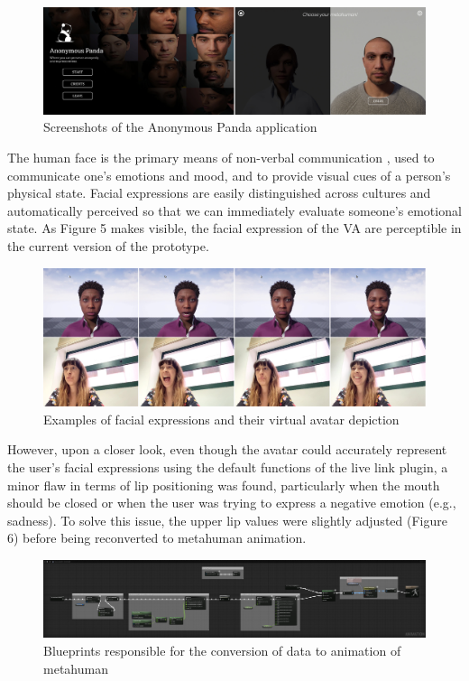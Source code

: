 \begin{figure}[h!]
\includegraphics[width=\textwidth]{figures/ui-app.jpg}
\centering
\caption{Screenshots of the Anonymous Panda application}
\end{figure}

The human face is the primary means of non-verbal communication \cite{MALO20, KUJ03, SAU19}, used to communicate one's emotions and mood, and to provide visual cues of a person's physical state. Facial expressions are easily distinguished across cultures and automatically perceived so that we can immediately evaluate someone's emotional state. As Figure 5 makes visible, the facial expression of the VA are perceptible in the current version of the prototype. 

\begin{figure}[h!]
\includegraphics[width=\textwidth]{figures/expressionTest.jpg}
\centering
\caption{Examples of facial expressions and their virtual avatar depiction}
\end{figure}

However, upon a closer look, even though the avatar could accurately represent the user's facial expressions using the default functions of the live link plugin, a minor flaw in terms of lip positioning was found, particularly when the mouth should be closed or when the user was trying to express a negative emotion (e.g., sadness). To solve this issue, the upper lip values were slightly adjusted (Figure 6) before being reconverted to metahuman animation.

\begin{figure}[h!]
\includegraphics[width=\textwidth]{figures/facialConfig.png}
\centering
\caption{Blueprints responsible for the conversion of data to animation of metahuman}
\end{figure}

